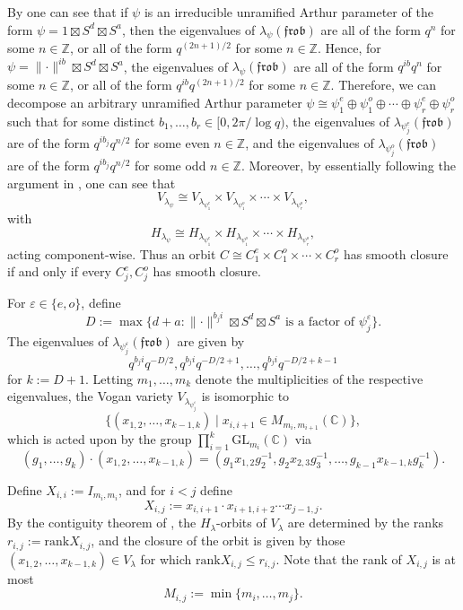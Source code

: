\documentclass[12pt]{amsart}
\newcommand\norm[1]{\lVert#1\rVert}
\theoremstyle{plain}
\theoremstyle{definition}
\newcommand{\mf}{\mathfrak}
\newcommand{\bc}{\mathbb{C}}
\newcommand{\bz}{\mathbb{Z}}
\newcommand{\tx}{\text}
\newcommand{\1}{\mathbbm{1}}
\newcommand{\GL}{\mathrm{GL}}
\begin{document}
	



	By \cite[Equation (18)]{CR24} one can see that if $\psi$ is an irreducible unramified Arthur parameter of the form $\psi=1\boxtimes S^d\boxtimes S^a$, then the eigenvalues of $\lambda_\psi(\mf{frob})$ are all of the form $q^n$ for some $n\in \bz$, or all of the form $q^{(2n+1)/2}$ for some $n\in \bz$.  
	Hence, for $\psi=\norm{\cdot}^{ib}\boxtimes S^d\boxtimes S^a$, the eigenvalues of $\lambda_\psi(\mf{frob})$ are all of the form $q^{ib}q^n$ for some $n\in \bz$, or all of the form $q^{ib}q^{(2n+1)/2}$ for some $n\in \bz$.  
	Therefore, we can decompose an arbitrary unramified Arthur parameter $\psi\cong \psi_1^e\oplus\psi_1^o\oplus \cdots \oplus \psi_r^e\oplus \psi_r^o$ such that for some distinct $b_1, \ldots, b_r\in [0, 2\pi /\log q)$, the eigenvalues of $\lambda_{\psi_j^e}(\mf{frob})$ are of the form $q^{ib_j}q^{n/2}$ for some even $n\in \bz$, and the eigenvalues of $\lambda_{\psi_j^o}(\mf{frob})$ are of the form $q^{ib_j}q^{n/2}$ for some odd $n\in \bz$. 
	Moreover, by essentially following the argument in \cite[Lemma 3.1]{Bal}, one can see that
	$$V_{\lambda_\psi}\cong V_{\lambda_{\psi_1^e}}\times V_{\lambda_{\psi_1^o}}\times\cdots \times V_{\lambda_{\psi_r^o}},$$
	with
	 	$$H_{\lambda_\psi}\cong H_{\lambda_{\psi_1^e}}\times H_{\lambda_{\psi_1^o}}\times\cdots \times H_{\lambda_{\psi_r^o}},$$
	 	acting component-wise. 
	 	Thus an orbit $C\cong C_1^e\times C_1^o\times \cdots \times C_r^o$ has smooth closure if and only if every $C_j^e, C_j^o$ has smooth closure. 
	
	For $\varepsilon\in\{e, o\}$, define
	$$D:=\max\{d+a : \norm{\cdot}^{b_ji}\boxtimes S^{d}\boxtimes S^{a} \tx{ is a factor of } \psi_j^\varepsilon \}.$$
	 The eigenvalues of $\lambda_{\psi_j^\varepsilon}(\mf{frob})$ are given by
	  $$q^{b_ji}q^{-D/2}, q^{b_ji}q^{-D/2+1}, \ldots, q^{b_ji}q^{-D/2+k-1}$$
	   for $k:=D+1$.  
	Letting $m_1, \ldots, m_{k}$ denote the multiplicities of the respective eigenvalues, the Vogan variety $V_{\lambda_{\psi_j^\varepsilon}}$ is isomorphic to
	$$\{(x_{1,2}, \ldots, x_{k-1, k})  \mid x_{i, i+1}\in M_{m_i, m_{i+1}}(\bc)\},$$
	which is acted upon by the group $\prod_{i=1}^k\GL_{m_i}(\bc)$ via 
	$$(g_1, \ldots, g_k)\cdot(x_{1,2}, \ldots, x_{k-1,k})=(g_1x_{1,2}g_2^{-1}, g_2x_{2,3}g_3^{-1}, \ldots, g_{k-1}x_{k-1,k}g_k^{-1}).$$
	
	
	Define $X_{i,i}:=I_{m_i, m_i}$, and for $i<j$ define
	$$X_{i,j}:=x_{i, i+1}\cdot x_{i+1, i+2}\cdots x_{j-1, j}.$$
By the contiguity theorem of \cite{Zel}, the $H_\lambda$-orbits of $V_\lambda$ are determined by the ranks $r_{i,j}:=\tx{rank} X_{i,j}$, and the closure of the orbit is given by those $(x_{1,2}, \ldots, x_{k-1,k})\in V_\lambda$ for which $\tx{rank} X_{i,j}\leq r_{i, j}$. 
Note that the rank of $X_{i,j}$ is at most 
	$$M_{i,j}:=\min\{m_i, \ldots, m_j\}.$$
\end{document}
